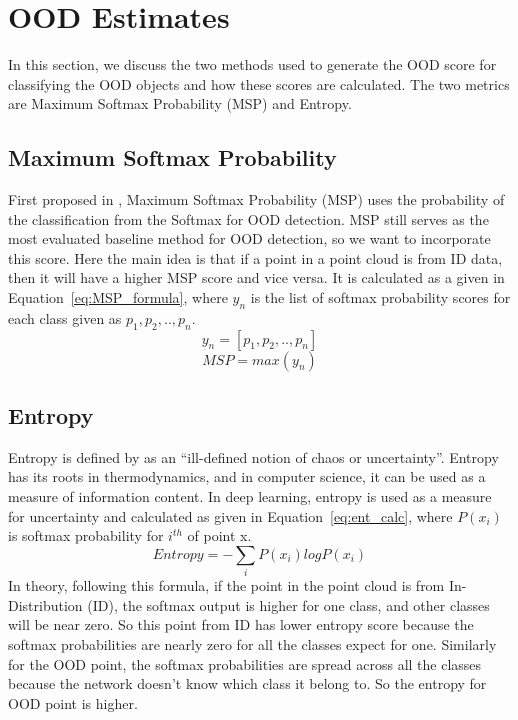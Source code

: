\section{OOD Estimates}
In this section, we discuss the two methods used to generate the OOD score for classifying the OOD objects and how these scores are calculated.
The two metrics are Maximum Softmax Probability (MSP) and Entropy.

\subsection{Maximum Softmax Probability}
First proposed in \cite{hendrycks2016baseline_MSP}, Maximum Softmax Probability (MSP) uses the probability of the classification from the Softmax for OOD detection. 
MSP still serves as the most evaluated baseline method for OOD detection, so we want to incorporate this score. 
Here the main idea is that if a point in a point cloud is from ID data, then it will have a higher MSP score and vice versa.
It is calculated as a given in Equation~\ref{eq:MSP_formula}, where $y_n$ is the list of softmax probability scores for each class given as $p_1, p_2, .., p_n$.
$$y_n = [p_1, p_2,..,p_n]$$
\begin{equation}
    MSP = max(y_n)
    \label{eq:MSP_formula}
\end{equation}

\subsection{Entropy}
\label{sec:meth_entropy}
Entropy is defined by \cite{entropy_robinson} as an ``ill-defined notion of chaos or uncertainty''.
Entropy has its roots in thermodynamics, and in computer science, it can be used as a measure of information content.
In deep learning, entropy is used as a measure for uncertainty and calculated as given in Equation~\ref{eq:ent_calc}, where $P(x_i)$ is softmax probability for $i^{th}$ of point x.
\begin{equation}
    Entropy = -\sum_i P(x_i) log P(x_i)
    \label{eq:ent_calc}
\end{equation}
In theory, following this formula, if the point in the point cloud is from In-Distribution (ID), the softmax output is higher for one class, and other classes will be near zero.
So this point from ID has lower entropy score because the softmax probabilities are nearly zero for all the classes expect for one.
Similarly for the OOD point, the softmax probabilities are spread across all the classes because the network doesn't know which class it belong to. So the entropy for OOD point is higher.

